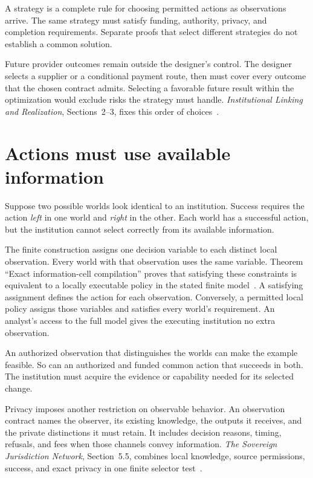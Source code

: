 \documentclass{momentum}
\begin{document}
A strategy is a complete rule for choosing permitted actions as observations arrive.
The same strategy must satisfy funding, authority, privacy, and completion requirements.
Separate proofs that select different strategies do not establish a common solution.

Future provider outcomes remain outside the designer's control.
The designer selects a supplier or a conditional payment route, then must cover every outcome that the chosen contract admits.
Selecting a favorable future result within the optimization would exclude risks the strategy must handle.
\emph{Institutional Linking and Realization}, Sections~2--3, fixes this order of choices~\cite{linking}.

\section{Actions must use available information}
\label{sec:observations}

Suppose two possible worlds look identical to an institution.
Success requires the action \emph{left} in one world and \emph{right} in the other.
Each world has a successful action, but the institution cannot select correctly from its available information.

The finite construction assigns one decision variable to each distinct local observation.
Every world with that observation uses the same variable.
Theorem ``Exact information-cell compilation'' proves that satisfying these constraints is equivalent to a locally executable policy in the stated finite model~\cite[Section~3]{linking}.
A satisfying assignment defines the action for each observation.
Conversely, a permitted local policy assigns those variables and satisfies every world's requirement.
An analyst's access to the full model gives the executing institution no extra observation.

An authorized observation that distinguishes the worlds can make the example feasible. So can an authorized and funded common action that succeeds in both.
The institution must acquire the evidence or capability needed for its selected change.

Privacy imposes another restriction on observable behavior.
An observation contract names the observer, its existing knowledge, the outputs it receives, and the private distinctions it must retain.
It includes decision reasons, timing, refusals, and fees when those channels convey information.
\emph{The Sovereign Jurisdiction Network}, Section~5.5, combines local knowledge, source permissions, success, and exact privacy in one finite selector test~\cite{recognition}.
\end{document}
